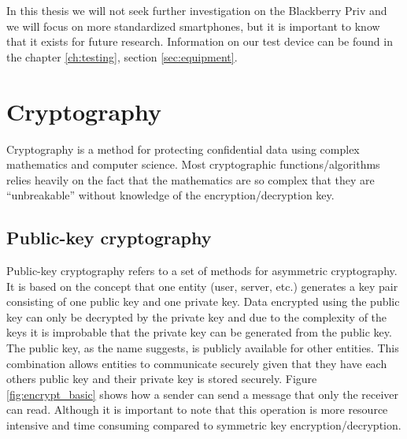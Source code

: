 In this thesis we will not seek further investigation on the Blackberry Priv and we will focus on more standardized smartphones, but it is important to know that it exists for future research. Information on our test device can be found in the chapter \ref{ch:testing}, section \ref{sec:equipment}.



\section{Cryptography}
Cryptography is a method for protecting confidential data using complex mathematics and computer science. Most cryptographic functions/algorithms relies heavily on the fact that the mathematics are so complex that they are ``unbreakable'' without knowledge of the encryption/decryption key.

\subsection{Public-key cryptography}
\label{sec:publicKeyCrypto}
Public-key cryptography refers to a set of methods for asymmetric cryptography. It is based on the concept that one entity (user, server, etc.) generates a key pair consisting of one public key and one private key. Data encrypted using the public key can only be decrypted by the private key and due to the complexity of the keys it is improbable that the private key can be generated from the public key. The public key, as the name suggests, is publicly available for other entities. This combination allows entities to communicate securely given that they have each others public key and their private key is stored securely. Figure \ref{fig:encrypt_basic} shows how a sender can send a message that only the receiver can read. Although it is important to note that this operation is more resource intensive and time consuming compared to symmetric key encryption/decryption.

